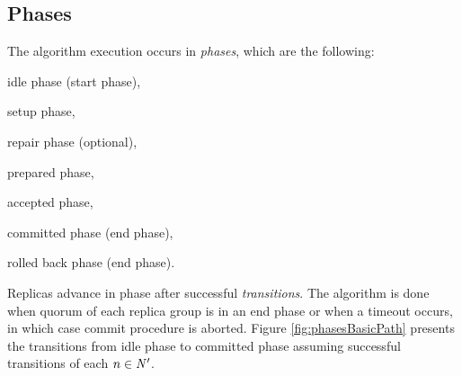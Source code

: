\subsection{Phases}
The algorithm execution occurs in \emph{phases}, which are the following: 
\begin{enumerate*}[label=\alph*)]
\item idle phase (start phase),
\item setup phase,
\item repair phase (optional),
\item prepared phase,
\item accepted phase,
\item committed phase (end phase),
\item rolled back phase (end phase).
\end{enumerate*}

Replicas advance in phase after successful \emph{transitions}. The algorithm is done when quorum of each replica group is in an end phase or when a timeout occurs, in which case commit procedure is aborted. Figure \ref{fig:phasesBasicPath} presents the transitions from idle phase to committed phase assuming successful transitions of each $n\in \text{$\mathit{N'}$}$. 

\newcommand{\setupTransition}{$\mathit{setup\_transition()}$\xspace}
\newcommand{\prepareTransition}{$\mathit{prepare\_transition()}$\xspace}
\newcommand{\proposeTransition}{$\mathit{propose\_transition()}$\xspace}
\newcommand{\commitTransition}{$\mathit{commit\_transition()}$\xspace}
\newcommand{\repairingTransition}{$\mathit{reparing\_transition()}$\xspace}




